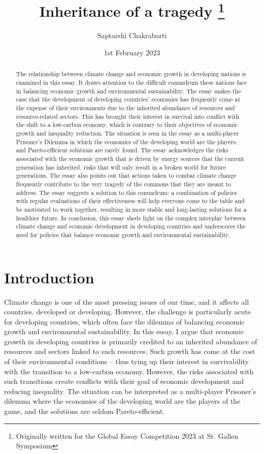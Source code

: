 \documentclass[12pt,a4paper]{article}
\title{Inheritance of a tragedy \footnote{Originally written for the Global Essay Competition 2023 at St. Gallen Symposium}}
\author{Saptarshi Chakrabarti}
\date{1st February 2023}
\begin{document}
\maketitle

\begin{abstract}
The relationship between climate change and economic growth in developing nations is examined in this essay. It draws attention to the difficult conundrum these nations face in balancing economic growth and environmental sustainability. The essay makes the case that the development of developing countries' economies has frequently come at the expense of their environments due to the inherited abundance of resources and resource-related sectors. This has brought their interest in survival into conflict with the shift to a low-carbon economy, which is contrary to their objectives of economic growth and inequality reduction. The situation is seen in the essay as a multi-player Prisoner's Dilemma in which the economies of the developing world are the players, and Pareto-efficient solutions are rarely found. The essay acknowledges the risks associated with the economic growth that is driven by energy sources that the current generation has inherited, risks that will only result in a broken world for future generations. The essay also points out that actions taken to combat climate change frequently contribute to the very tragedy of the commons that they are meant to address. The essay suggests a solution to this conundrum: a combination of policies with regular evaluations of their effectiveness will help everyone come to the table and be motivated to work together, resulting in more stable and long-lasting solutions for a healthier future. In conclusion, this essay sheds light on the complex interplay between climate change and economic development in developing countries and underscores the need for policies that balance economic growth and environmental sustainability.
\end{abstract}

\newpage
\section*{Introduction}
Climate change is one of the most pressing issues of our time, and it affects all countries, developed or developing. However, the challenge is particularly acute for developing countries, which often face the dilemma of balancing economic growth and environmental sustainability. In this essay, I argue that economic growth in developing countries is primarily credited to an inherited abundance of resources and sectors linked to such resources. Such growth has come at the cost of their environmental conditions – thus tying up their interest in survivability with the transition to a low-carbon economy. However, the risks associated with such transitions create conflicts with their goal of economic development and reducing inequality. The situation can be interpreted as a multi-player Prisoner's dilemma where the economies of the developing world are the players of the game, and the solutions are seldom Pareto-efficient. 
\end{document}
